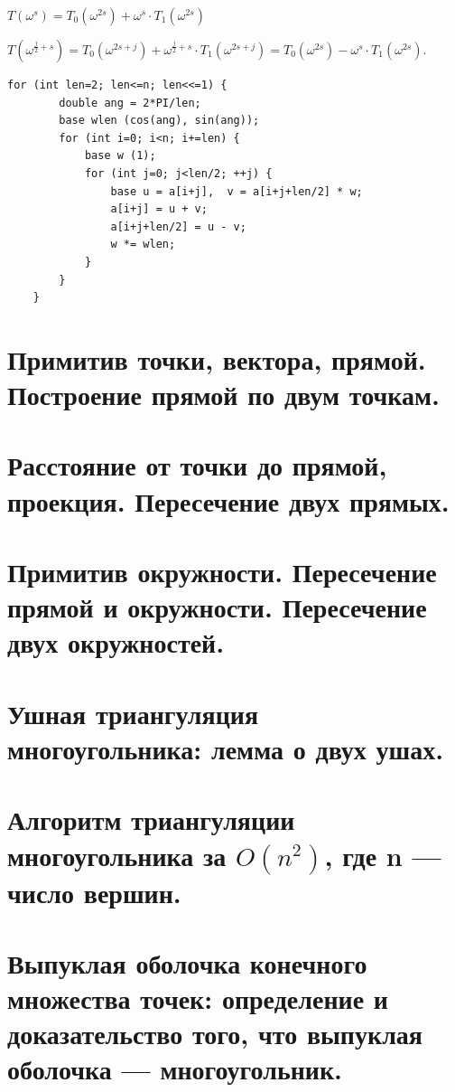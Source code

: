 \begin{center}
    $T (\omega^s) = T_0 (\omega^{2s}) + \omega^s \cdot T_1 (\omega^{2s})$
    
    $T (\omega^{\frac{j}{2} + s}) = T_0 (\omega^{2s + j}) + \omega^{\frac{j}{2} + s} \cdot T_1 (\omega^{2s + j}) = T_0(\omega^{2s}) - \omega^s \cdot T_1 (\omega^{2s})$.
\end{center}
\begin{lstlisting}
for (int len=2; len<=n; len<<=1) {
		double ang = 2*PI/len;
		base wlen (cos(ang), sin(ang));
		for (int i=0; i<n; i+=len) {
			base w (1);
			for (int j=0; j<len/2; ++j) {
				base u = a[i+j],  v = a[i+j+len/2] * w;
				a[i+j] = u + v;
				a[i+j+len/2] = u - v;
				w *= wlen;
			}
		}
	}
\end{lstlisting}
\newpage{}

\section{Примитив точки, вектора, прямой. Построение прямой по двум точкам.}

\newpage{}

\section{Расстояние от точки до прямой, проекция. Пересечение двух прямых.}

\newpage{}

\section{Примитив окружности. Пересечение прямой и окружности. Пересечение двух окружностей.}

\newpage{}

\section{Ушная триангуляция многоугольника: лемма о двух ушах.}


\section{Алгоритм триангуляции многоугольника за $O(n^2)$, где n — число вершин.}


\section{Выпуклая оболочка конечного множества точек: определение и доказательство того, что выпуклая оболочка — многоугольник.}

